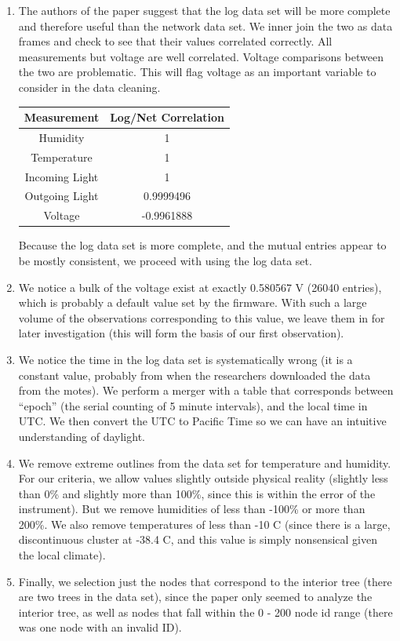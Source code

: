 \documentclass[english]{article}\usepackage[]{graphicx}\usepackage[]{color}
\begin{document}
\begin{enumerate}
\item The authors of the paper suggest that the log data set will be more complete 
and therefore useful than the network data set.  We inner join the two as data frames 
and check to see that their values correlated correctly.  All measurements
but voltage are well correlated.  Voltage comparisons between the two are problematic.
This will flag voltage as an important variable to consider in the data cleaning.

\begin{center}
\begin{tabular}{ c || c }
 Measurement & Log/Net Correlation \\ \hline
 Humidity & 1 \\
 Temperature & 1 \\
 Incoming Light & 1 \\
 Outgoing Light & 0.9999496 \\
 Voltage & -0.9961888 \\

\end{tabular}
\end{center}

Because the log data set is more complete, and the mutual entries appear to be mostly consistent,
we proceed with using the log data set.

\item We notice a bulk of the voltage exist at exactly 0.580567 V (26040 entries), which is probably a default value set by the firmware.  With such a large volume of the 
observations corresponding to this value, we leave them in for later investigation (this 
will form the basis of our first observation).
\item We notice the time in the log data set is systematically wrong (it is a constant value, 
probably from when the researchers downloaded the data from the motes).  We perform a merger
with a table that corresponds between ``epoch'' (the serial counting of 5 minute intervals),
and the local time in UTC.  We then convert the UTC to Pacific Time so we can have an 
intuitive understanding of daylight.
\item We remove extreme outlines from the data set for temperature and humidity.  For
our criteria, we allow values slightly outside physical reality (slightly less than 0\%
and slightly more than 100\%, since this is within the error of the instrument).
But we remove humidities of less than -100\% or more than 200\%.
We also remove temperatures of less than -10 C (since there is a large, discontinuous cluster at 
-38.4 C, and this value is simply nonsensical given the local climate).
\item Finally, we selection just the nodes that correspond to the interior tree (there are two 
trees in the data set), since the paper only seemed to analyze the interior tree, as well as nodes
that fall within the 0 - 200 node id range (there was one node with an invalid ID).
\end{enumerate}
\end{document}
